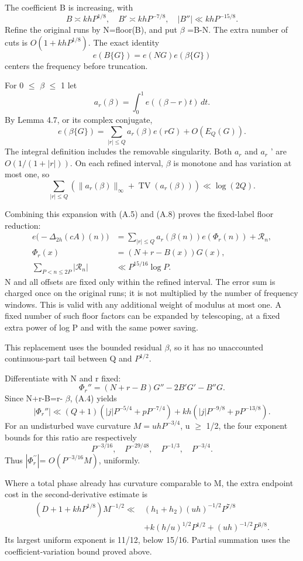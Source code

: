 \documentclass[11pt,a4paper]{article}
\begin{document}
The coefficient B is increasing, with \[
B\asymp khP^{1/8},\quad
B'\asymp khP^{-7/8},\quad
|B''|\ll khP^{-15/8}.
\] Refine the original runs by N=floor(B), and put \(\beta\) =B-N. The
extra number of cuts is \(O(1+khP^{1/8})\). The exact identity \[
e(B\{G\})=e(NG)e(\beta\{G\})
\] centers the frequency before truncation.

For 0 \(\le\) \(\beta\) \(\le\) 1 let \[
a_r(\beta)=\int_0^1 e((\beta-r)t)\,dt.
\] By Lemma 4.7, or its complex conjugate, \[
e(\beta\{G\})
=\sum_{|r|\le Q}a_r(\beta)e(rG)+O(E_Q(G)).
\] The integral definition includes the removable singularity. Both
\textbar{} \(a_r\) \textbar{} and \textbar{} \(a_r\) '\textbar{} are
\(O(1/(1+|r|))\). On each refined interval, \(\beta\) is monotone and
has variation at most one, so \[
\sum_{|r|\le Q}
\left(\|a_r(\beta)\|_\infty+\operatorname{TV}(a_r(\beta))\right)
\ll\log(2Q).
\]

Combining this expansion with (A.5) and (A.8) proves the fixed-label
floor reduction: \[
\begin{split}
e\bigl(-\Delta_{2h}(cA)(n)\bigr)
&=\sum_{|r|\le Q}a_r(\beta(n))e(\Phi_r(n))+\mathcal R_n,\\
\Phi_r(x)&=(N+r-B(x))G(x),\\
\sum_{P<n\le2P}|\mathcal R_n|&\ll P^{15/16}\log P.
\end{split}\tag{A.9}
\] N and all offsets are fixed only within the refined interval. The
error sum is charged once on the original runs; it is not multiplied by
the number of frequency windows. This is valid with any additional
weight of modulus at most one. A fixed number of such floor factors can
be expanded by telescoping, at a fixed extra power of log P and with the
same power saving.

This replacement uses the bounded residual \(\beta\), so it has no
unaccounted continuous-part tail between Q and \(P^{1/2}\).

Differentiate with N and r fixed: \[
\Phi_r''=(N+r-B)G''-2B'G'-B''G.
\] Since N+r-B=r- \(\beta\), (A.4) yields \[
|\Phi_r''|\ll
(Q+1)(|j|P^{-5/4}+pP^{-7/4})
+kh(|j|P^{-9/8}+pP^{-13/8}). \tag{A.10}
\] For an undisturbed wave curvature \(M=uhP^{-3/4}\), u \(\ge\) 1/2,
the four exponent bounds for this ratio are respectively \[
P^{-3/16},\quad P^{-29/48},\quad
P^{-1/3},\quad P^{-3/4}.
\] Thus \(|\Phi_r^{\prime\prime}|\)= \(O(P^{-3/16}M)\), uniformly.

Where a total phase already has curvature comparable to M, the extra
endpoint cost in the second-derivative estimate is \[
\begin{split}
(D+1+khP^{1/8})M^{-1/2}
\ll{}&(h_1+h_2)(uh)^{-1/2}P^{7/8}\\
&+k(h/u)^{1/2}P^{1/2}+(uh)^{-1/2}P^{3/8}.
\end{split} \tag{A.11}
\] Its largest uniform exponent is 11/12, below 15/16. Partial summation
uses the coefficient-variation bound proved above.
\end{document}
